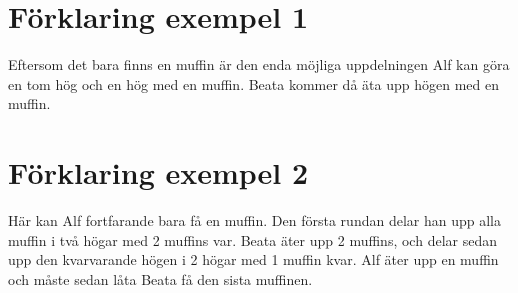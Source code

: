 \section*{Förklaring exempel 1}
Eftersom det bara finns en muffin är den enda möjliga uppdelningen Alf kan göra en tom hög och en hög med en muffin. Beata kommer då äta upp högen med en muffin. 

\section*{Förklaring exempel 2}
Här kan Alf fortfarande bara få en muffin. Den första rundan delar han upp alla muffin i två högar med 2 muffins var. Beata äter upp 2 muffins, och delar sedan upp den kvarvarande högen i 2 högar med 1 muffin kvar. Alf äter upp en muffin och måste sedan låta Beata få den sista muffinen.
